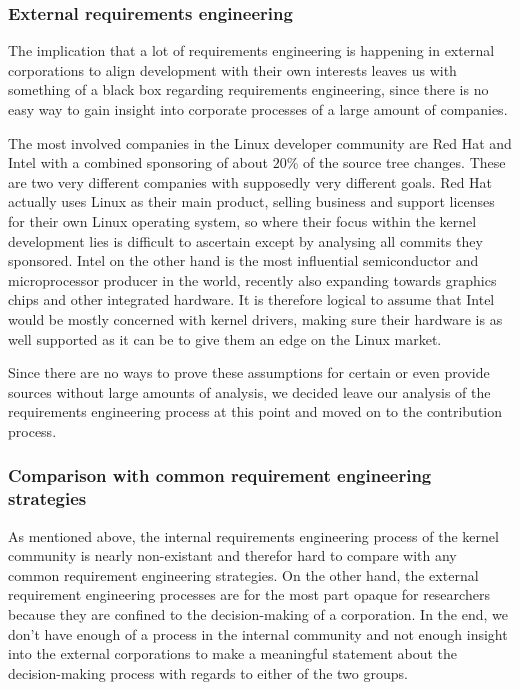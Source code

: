 \documentclass{sig-alternate-05-2015}
\begin{document}
\subsubsection{External requirements engineering}

The implication that a lot of requirements engineering is happening in external corporations to align development with their own interests leaves us with something of a black box regarding requirements engineering, since there is no easy way to gain insight into corporate processes of a large amount of companies.

The most involved companies in the Linux developer community are Red Hat and Intel with a combined sponsoring of about \(20\%\) of the source tree changes.
These are two very different companies with supposedly very different goals.
Red Hat actually uses Linux as their main product, selling business and support licenses for their own Linux operating system, so where their focus within the kernel development lies is difficult to ascertain except by analysing all commits they sponsored.
Intel on the other hand is the most influential semiconductor and microprocessor producer in the world, recently also expanding towards graphics chips and other integrated hardware.
It is therefore logical to assume that Intel would be mostly concerned with kernel drivers, making sure their hardware is as well supported as it can be to give them an edge on the Linux market.

Since there are no ways to prove these assumptions for certain or even provide sources without large amounts of analysis, we decided leave our analysis of the requirements engineering process at this point and moved on to the contribution process.

\subsubsection{Comparison with common requirement engineering strategies}

As mentioned above, the internal requirements engineering process of the kernel community is nearly non-existant and therefor hard to compare with any common requirement engineering strategies.
On the other hand, the external requirement engineering processes are for the most part opaque for researchers because they are confined to the decision-making of a corporation.
In the end, we don't have enough of a process in the internal community and not enough insight into the external corporations to make a meaningful statement about the decision-making process with regards to either of the two groups.
\end{document}
